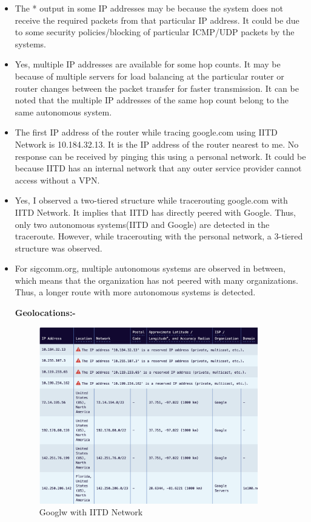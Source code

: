 \documentclass{article}
\begin{document}
\begin{itemize}
    \item The * output in some IP addresses may be because the system does not receive the required packets from that particular IP address. It could be due to some security policies/blocking of particular ICMP/UDP packets by the systems.
    \item Yes, multiple IP addresses are available for some hop counts. It may be because of multiple servers for load balancing at the particular router or router changes between the packet transfer for faster transmission. It can be noted that the multiple IP addresses of the same hop count belong to the same autonomous system.
    \item The first IP address of the router while tracing google.com using IITD Network is 10.184.32.13. It is the IP address of the router nearest to me. No response can be received by pinging this using a personal network. It could be because IITD has an internal network that any outer service provider cannot access without a VPN.
    \item Yes, I observed a two-tiered structure while tracerouting google.com with IITD Network. It implies that IITD has directly peered with Google. Thus, only two autonomous systems(IITD and Google) are detected in the traceroute. However, while tracerouting with the personal network, a 3-tiered structure was observed. 
    \item For sigcomm.org, multiple autonomous systems are observed in between, which means that the organization has not peered with many organizations. Thus, a longer route with more autonomous systems is detected.

    \textbf{Geolocations:- }

    \begin{figure}[H]
    \centering
    \includegraphics[width=0.9\textwidth]{geolocation_google_IITD.png}
    \caption*{Googlw with IITD Network}
    \end{figure}


\end{itemize}
\end{document}
